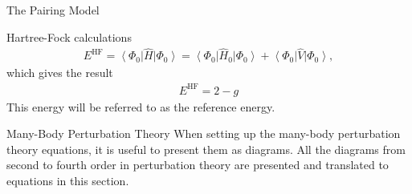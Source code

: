 \documentclass[twoside,english]{uiofysmaster}
\begin{document}
\begin{chapter}{The Pairing Model}
\begin{section}{Hartree-Fock calculations}
 		\begin{align}
 			E^{\text{HF}} = \left< \Phi_0 \right| \hat H \left| \Phi_0 \right> = \left< \Phi_0 \right| \hat H_0 \left| \Phi_0 \right> + \left< \Phi_0 \right| \hat V \left| \Phi_0 \right>, 
 		\end{align}
 		which gives the result
 		\begin{align}
 			E^{\text{HF}} = 2 - g 
 		\end{align}
 		This energy will be referred to as the reference energy. 
 	\end{section}

	\begin{section}{Many-Body Perturbation Theory}
 		When setting up the many-body perturbation theory
                equations, it is useful to present them as
                diagrams. All the diagrams from   second to fourth
                order in perturbation theory are presented and translated
                to equations in this section.
 		

\end{section}
\end{chapter}
\end{document}
